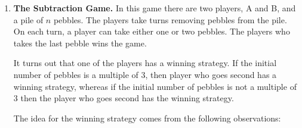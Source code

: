 \documentclass[]{book}
\makeatletter
\newenvironment{Shaded}{\begin{snugshade}}{\end{snugshade}}
\newcommand{\KeywordTok}[1]{\textcolor[rgb]{0.13,0.29,0.53}{\textbf{#1}}}
\newcommand{\DataTypeTok}[1]{\textcolor[rgb]{0.13,0.29,0.53}{#1}}
\newcommand{\DecValTok}[1]{\textcolor[rgb]{0.00,0.00,0.81}{#1}}
\newcommand{\OperatorTok}[1]{\textcolor[rgb]{0.81,0.36,0.00}{\textbf{#1}}}
\newcommand{\NormalTok}[1]{#1}
\newenvironment{kframe}{%
\medskip{}
\setlength{\fboxsep}{.8em}
 \def\at@end@of@kframe{}%
 \ifinner\ifhmode%
  \def\at@end@of@kframe{\end{minipage}}%
  \begin{minipage}{\columnwidth}%
 \fi\fi%
 \def\FrameCommand##1{\hskip\@totalleftmargin \hskip-\fboxsep
 \colorbox{shadecolor}{##1}\hskip-\fboxsep
     \hskip-\linewidth \hskip-\@totalleftmargin \hskip\columnwidth}%
 \MakeFramed {\advance\hsize-\width
   \@totalleftmargin\z@ \linewidth\hsize
   \@setminipage}}%
 {\par\unskip\endMakeFramed%
 \at@end@of@kframe}
\renewenvironment{Shaded}{\begin{kframe}}{\end{kframe}}
\theoremstyle{definition}
\theoremstyle{definition}
\theoremstyle{definition}
\theoremstyle{remark}
\makeatother
\begin{document}
{\begin{enumerate}
\begin{Shaded}
\begin{Highlighting}[]
\KeywordTok{madhavaGraph}\NormalTok{(}\DataTypeTok{n =} \OperatorTok{-}\DecValTok{3}\NormalTok{)}
\end{Highlighting}
\end{Shaded}

\begin{verbatim}
## You need to enter a positive integer.  Try again!
\end{verbatim}

  Here is another example:

\begin{Shaded}
\begin{Highlighting}[]
\KeywordTok{madhavaGraph}\NormalTok{(}\DataTypeTok{n =} \DecValTok{20}\NormalTok{)}
\end{Highlighting}
\end{Shaded}

  The output should be as in Figure \ref{fig:madhavaGraph}.

  \begin{figure}

  {\centering \texttt{[image: r-notes\_files/figure-latex/madhavaGraph-1]} 

  }

  \caption{This is how the output of the     madhavaGraph function should look.}\label{fig:madhavaGraph}
  \end{figure}
\item
  \textbf{The Subtraction Game.} In this game there are two players, A
  and B, and a pile of \(n\) pebbles. The players take turns removing
  pebbles from the pile. On each turn, a player can take either one or
  two pebbles. The players who takes the last pebble wins the game.

  It turns out that one of the players has a winning strategy. If the
  initial number of pebbles is a multiple of 3, then player who goes
  second has a winning strategy, whereas if the initial number of
  pebbles is not a multiple of 3 then the player who goes second has the
  winning strategy.

  The idea for the winning strategy comes from the following
  observations:


\end{enumerate}}
\end{document}
